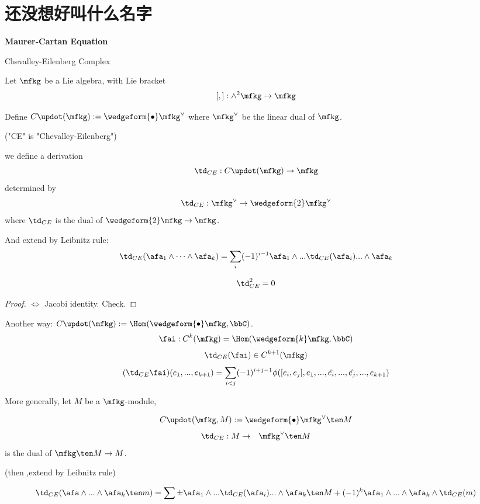 
\chapter{还没想好叫什么名字}

\textbf{Maurer-Cartan Equation}

Chevalley-Eilenberg Complex

Let $\mfkg$ be a Lie algebra, with Lie bracket 
$$[,]:\wedge^2\mfkg\to\mfkg$$

Define $C\updot(\mfkg):=\wedgeform{\bullet}\mfkg^\vee$
where $\mfkg^\vee$ be the linear dual of $\mfkg$.

("CE" is "Chevalley-Eilenberg")

we define a derivation 
$$\td_{CE}:C\updot(\mfkg)\to\mfkg$$
determined by 
$$\td_{CE}:\mfkg^\vee\to\wedgeform{2}\mfkg^\vee$$
where $\td_{CE}$ is the dual of $\wedgeform{2}\mfkg\to\mfkg$.

And extend by Leibnitz rule:
$$\td_{CE}(\afa_1\wedge\cdots\wedge\afa_k)
=
\sum_i(-1)^{i-1}
\afa_1\wedge...\td_{CE}(\afa_i)...\wedge\afa_k
$$

\begin{prop}
$$\td_{CE}^2=0$$
\end{prop}
\begin{proof}
$\iff$ Jacobi identity. Check.
\end{proof}

Another way: $C\updot(\mfkg):=\Hom(\wedgeform{\bullet}\mfkg,\bbC)$.
$$\fai:C^k(\mfkg)=\Hom(\wedgeform{k}\mfkg,\bbC)$$
$$\td_{CE}(\fai)\in C^{k+1}(\mfkg)$$
$$(\td_{CE}\fai)(e_1,...,e_{k+1})=
   \sum_{i<j}
     (-1)^{i+j-1}
     \phi([e_i,e_j],e_1,...,\hat{e_i},...,\hat{e_j},...,e_{k+1})
$$

More generally, let $M$ be a $\mfkg$-module,
\begin{definition}
$$C\updot(\mfkg,M):=\wedgeform{\bullet}\mfkg^\vee\ten M$$
\begin{eqnarray*}
\td_{CE}:M&\to&\mfkg^\vee\ten M\\
\end{eqnarray*}
is the dual of $\mfkg\ten M\to M$.

(then ,extend by Leibnitz rule)
\end{definition}

$$
  \td_{CE}(\afa\wedge...\wedge\afa_k\ten m)
=\sum\pm\afa_1\wedge...\td_{CE}(\afa_i)...\wedge\afa_k\ten M
+(-1)^k\afa_1\wedge...\wedge\afa_k\wedge\td_{CE}(m)
$$

